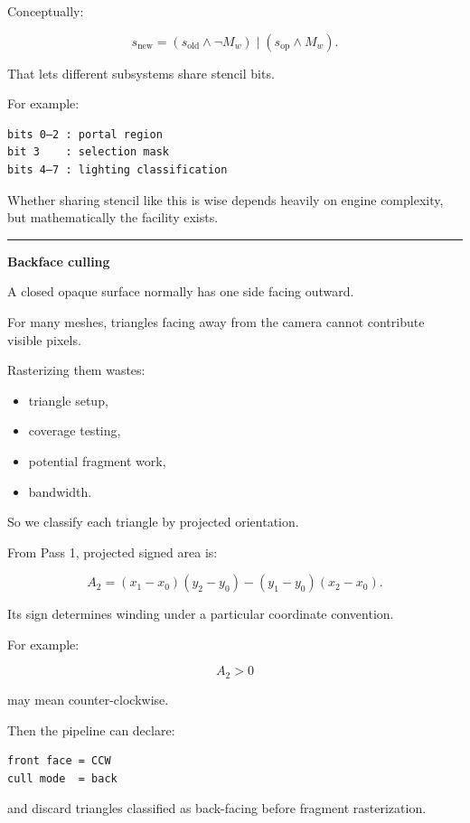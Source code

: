 Conceptually:

\[
s_{\text{new}}
=
(s_{\text{old}}\land\neg M_w)
\;|\;
(s_{\text{op}}\land M_w).
\]

That lets different subsystems share stencil bits.

For example:

\begin{verbatim}
bits 0–2 : portal region
bit 3    : selection mask
bits 4–7 : lighting classification
\end{verbatim}

Whether sharing stencil like this is wise depends heavily on engine complexity, but mathematically the facility exists.

\begin{center}\rule{0.5\linewidth}{0.5pt}\end{center}

\textbf{Backface culling}

A closed opaque surface normally has one side facing outward.

For many meshes, triangles facing away from the camera cannot contribute visible pixels.

Rasterizing them wastes:

\begin{itemize}
\tightlist
\item
  triangle setup,
\item
  coverage testing,
\item
  potential fragment work,
\item
  bandwidth.
\end{itemize}

So we classify each triangle by projected orientation.

From Pass 1, projected signed area is:

\[
A_2 =
(x_1-x_0)(y_2-y_0)
-
(y_1-y_0)(x_2-x_0).
\]

Its sign determines winding under a particular coordinate convention.

For example:

\[
A_2>0
\]

may mean counter-clockwise.

Then the pipeline can declare:

\begin{verbatim}
front face = CCW
cull mode  = back
\end{verbatim}

and discard triangles classified as back-facing before fragment rasterization.

